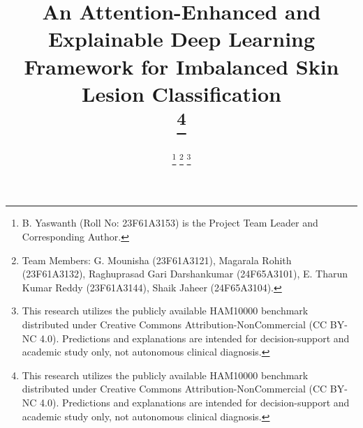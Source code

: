 \documentclass[conference]{IEEEtran}
\begin{document}
\title{An Attention-Enhanced and Explainable Deep Learning Framework for Imbalanced Skin Lesion Classification\\
\thanks{This research utilizes the publicly available HAM10000 benchmark distributed under Creative Commons Attribution-NonCommercial (CC BY-NC 4.0). Predictions and explanations are intended for decision-support and academic study only, not autonomous clinical diagnosis.}
}

\author{
\thanks{B. Yaswanth (Roll No: 23F61A3153) is the Project Team Leader and Corresponding Author.}
\thanks{Team Members: G. Mounisha (23F61A3121), Magarala Rohith (23F61A3132), Raghuprasad Gari Darshankumar (24F65A3101), E. Tharun Kumar Reddy (23F61A3144), Shaik Jaheer (24F65A3104).}
\thanks{This research utilizes the publicly available HAM10000 benchmark distributed under Creative Commons Attribution-NonCommercial (CC BY-NC 4.0). Predictions and explanations are intended for decision-support and academic study only, not autonomous clinical diagnosis.}
}

\maketitle
\end{document}
